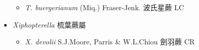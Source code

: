 \begin{itemize}
  \begin{itemize}
        \item[] \textit{T. buergerianum} (Miq.) Fraser-Jenk.  波氏星蕨   LC
  \end{itemize}
 \item[] \textit{Xiphopterella} 梳葉蕨屬
                                
  \begin{itemize}
        \item[] \textit{X. devolii} S.J.Moore, Parris \& W.L.Chiou  劍羽蕨   CR
  \end{itemize}
  \end{itemize}
